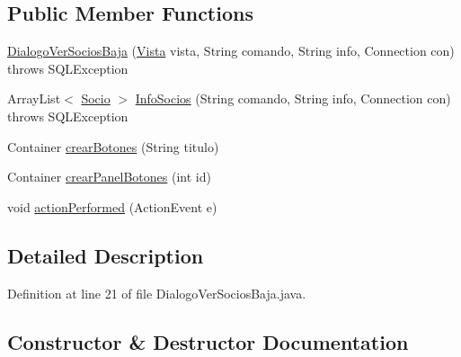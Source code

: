 \subsection*{Public Member Functions}
\begin{DoxyCompactItemize}
\item 
\mbox{\hyperlink{classsociedad2_1_1_dialogo_ver_socios_baja_a7dd9d7566b4eee0ce8d88b9cfec32600}{Dialogo\+Ver\+Socios\+Baja}} (\mbox{\hyperlink{classsociedad2_1_1_vista}{Vista}} vista, String comando, String info, Connection con)  throws S\+Q\+L\+Exception 
\item 
Array\+List$<$ \mbox{\hyperlink{classsociedad2_1_1_socio}{Socio}} $>$ \mbox{\hyperlink{classsociedad2_1_1_dialogo_ver_socios_baja_a6e73715c1f88a3649f9b524ca781b8e0}{Info\+Socios}} (String comando, String info, Connection con)  throws S\+Q\+L\+Exception 
\item 
Container \mbox{\hyperlink{classsociedad2_1_1_dialogo_ver_socios_baja_a21bf2bac56b7632ec153200d85733c52}{crear\+Botones}} (String titulo)
\item 
Container \mbox{\hyperlink{classsociedad2_1_1_dialogo_ver_socios_baja_a1690764694f81b9b5a5081178fe2ab77}{crear\+Panel\+Botones}} (int id)
\item 
void \mbox{\hyperlink{classsociedad2_1_1_dialogo_ver_socios_baja_abf0650961335d2802e33616ab71fef9e}{action\+Performed}} (Action\+Event e)
\end{DoxyCompactItemize}


\subsection{Detailed Description}


Definition at line 21 of file Dialogo\+Ver\+Socios\+Baja.\+java.



\subsection{Constructor \& Destructor Documentation}
\mbox{\label{classsociedad2_1_1_dialogo_ver_socios_baja_a7dd9d7566b4eee0ce8d88b9cfec32600}} 
